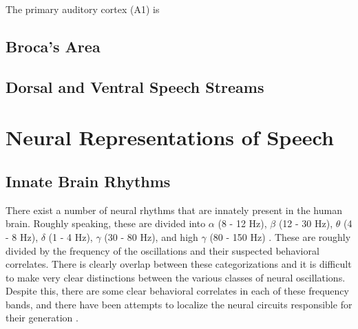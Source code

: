 \documentclass[titlepage]{article}
\begin{document}
    The primary auditory cortex (A1) is

  \subsection{Broca's Area}


  \subsection{Dorsal and Ventral Speech Streams}

\section{Neural Representations of Speech} \label{higher}

  \subsection{Innate Brain Rhythms} \label{innateBrainRhythms}

    There exist a number of neural rhythms that are innately present in the human brain. Roughly
    speaking, these are divided into $\alpha$ (8 - 12 Hz), $\beta$ (12 - 30 Hz),
    $\theta$ (4 - 8 Hz), $\delta$ (1 - 4 Hz),
    $\gamma$ (30 - 80 Hz), and high $\gamma$ (80 - 150 Hz) \cite{Muresan2008,Rangaswamy2002}. These are roughly divided by
    the frequency of the oscillations and their suspected behavioral correlates. There is clearly
    overlap between these categorizations and it is difficult to make very clear distinctions between
    the various classes of neural oscillations. Despite this, there are some clear behavioral correlates
    in each of these frequency bands, and there have been attempts to localize the neural circuits
    responsible for their generation \cite{Michel1992}.
\end{document}
